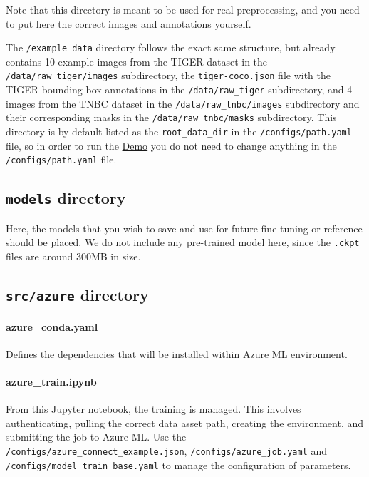 Note that this directory is meant to be used for real preprocessing, and
you need to put here the correct images and annotations yourself.

The \texttt{/example\_data} directory follows the exact same structure,
but already contains 10 example images from the TIGER dataset in the
\texttt{/data/raw\_tiger/images} subdirectory, the
\texttt{tiger-coco.json} file with the TIGER bounding box annotations in
the \texttt{/data/raw\_tiger} subdirectory, and 4 images from the TNBC
dataset in the \texttt{/data/raw\_tnbc/images} subdirectory and their
corresponding masks in the \texttt{/data/raw\_tnbc/masks} subdirectory.
This directory is by default listed as the \texttt{root\_data\_dir} in
the \texttt{/configs/path.yaml} file, so in order to run the
\hyperref[how-to-run-the-demo]{Demo} you do not need to change anything
in the \texttt{/configs/path.yaml} file.

\subsection{\texttt{models} directory}\label{models-directory}

Here, the models that you wish to save and use for future fine-tuning or
reference should be placed. We do not include any pre-trained model here,
since the \texttt{.ckpt} files are around 300MB in size.

\subsection{\texttt{src/azure} directory}\label{srcazure-directory}

\paragraph{azure\_conda.yaml}
Defines the dependencies that will be installed within Azure ML
environment.

\paragraph{azure\_train.ipynb}
From this Jupyter notebook, the training is managed. This involves
authenticating, pulling the correct data asset path, creating the
environment, and submitting the job to Azure ML. Use the
\texttt{/configs/azure\_connect\_example.json},
\texttt{/configs/azure\_job.yaml} and
\texttt{/configs/model\_train\_base.yaml} to manage the configuration of
parameters.

